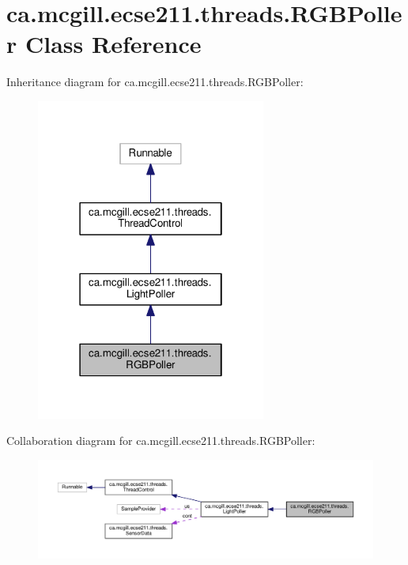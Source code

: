 \hypertarget{classca_1_1mcgill_1_1ecse211_1_1threads_1_1_r_g_b_poller}{}\section{ca.\+mcgill.\+ecse211.\+threads.\+R\+G\+B\+Poller Class Reference}
\label{classca_1_1mcgill_1_1ecse211_1_1threads_1_1_r_g_b_poller}


Inheritance diagram for ca.\+mcgill.\+ecse211.\+threads.\+R\+G\+B\+Poller\+:\nopagebreak
\begin{figure}[H]
\begin{center}
\leavevmode
\includegraphics[width=214pt]{classca_1_1mcgill_1_1ecse211_1_1threads_1_1_r_g_b_poller__inherit__graph}
\end{center}
\end{figure}


Collaboration diagram for ca.\+mcgill.\+ecse211.\+threads.\+R\+G\+B\+Poller\+:\nopagebreak
\begin{figure}[H]
\begin{center}
\leavevmode
\includegraphics[width=350pt]{classca_1_1mcgill_1_1ecse211_1_1threads_1_1_r_g_b_poller__coll__graph}
\end{center}
\end{figure}
